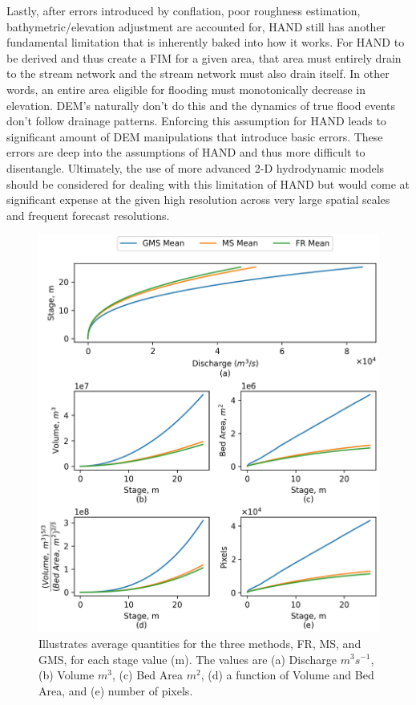 Lastly, after errors introduced by conflation, poor roughness estimation, bathymetric/elevation adjustment are accounted for, HAND still has another fundamental limitation that is inherently baked into how it works.
For HAND to be derived and thus create a FIM for a given area, that area must entirely drain to the stream network and the stream network must also drain itself.
In other words, an entire area eligible for flooding must monotonically decrease in elevation. 
DEM's naturally don't do this and the dynamics of true flood events don't follow drainage patterns.
Enforcing this assumption for HAND leads to significant amount of DEM manipulations that introduce basic errors.
These errors are deep into the assumptions of HAND and thus more difficult to disentangle.
Ultimately, the use of more advanced 2-D hydrodynamic models should be considered for dealing with this limitation of HAND but would come at significant expense at the given high resolution across very large spatial scales and frequent forecast resolutions.
%
\begin{figure}[h!]
\centering
\includegraphics[scale=1.0]{figures/rating_curve_comparison.jpg}
\caption{Illustrates average quantities for the three methods, FR, MS, and GMS, for each stage value (m). 
The values are (a) Discharge $m^3s^{-1}$, (b) Volume $m^3$, (c) Bed Area $m^2$, (d) a function of Volume and Bed Area, and (e) number of pixels.
}
\label{fig:rating_curve_comparison}
\end{figure}

